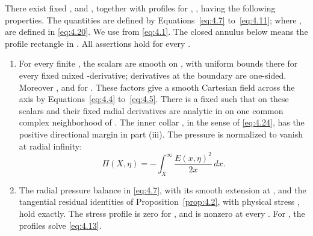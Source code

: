 \begin{theorem}\label{thm:4.6}
There exist fixed , and , together with profiles  for , , having the following properties. The quantities  are defined by Equations~\eqref{eq:4.7} to~\eqref{eq:4.11}; where ,  are defined in \eqref{eq:4.20}. We use  from \eqref{eq:4.1}. The closed annulus below means the profile rectangle  in . All assertions hold for every .
\begin{enumerate}[label=(\roman*)]
%
\item For every finite , the scalars  are smooth on , with uniform bounds there for every fixed mixed -derivative; derivatives at the boundary are one-sided. Moreover , and  for . These factors give a smooth Cartesian field across the axis by Equations~\eqref{eq:4.4} to~\eqref{eq:4.5}. There is a fixed  such that on  these scalars and their fixed radial derivatives are analytic in  on one common complex neighborhood of . The inner collar , in the sense of \eqref{eq:4.24}, has the positive directional margin in part (iii). The pressure is normalized to vanish at radial infinity:
\begin{equation}
  \Pi(X,\eta)=-\int_X^\infty\frac{E(x,\eta)^2}{2x}\,dx.
  \tag{4.25}\label{eq:4.25}
\end{equation}

\item The radial pressure balance  in \eqref{eq:4.7}, with its smooth extension  at , and the tangential residual identities of Proposition~\ref{prop:4.2}, with physical stress , hold exactly. The stress profile  is zero for , and is nonzero at every . For , the profiles solve \eqref{eq:4.13}.


\end{enumerate}
\end{theorem}
